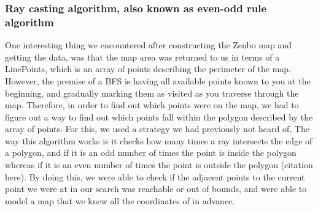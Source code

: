 \documentclass[conference]{IEEEtran}
\begin{document}
\subsubsection{Ray casting algorithm, also known as even-odd rule algorithm}
One interesting thing we encountered after constructing the Zenbo map and getting the data, was that the map area was returned to us in terms of a LinePoints, which is an array of points describing the perimeter of the map. However, the premise of a BFS is having all available points known to you at the beginning, and gradually marking them as visited as you traverse through the map. Therefore, in order to find out which points were on the map, we had to figure out a way to find out which points fall within the polygon described by the array of points. For this, we used a strategy we had previously not heard of. The way this algorithm works is it checks how many times a ray intersects the edge of a polygon, and if it is an odd number of times the point is inside the polygon whereas if it is an even number of times the point is outside the polygon (citation here). By doing this, we were able to check if the adjacent points to the current point we were at in our search was reachable or out of bounds, and were able to model a map that we knew all the coordinates of in advance.
\end{document}
